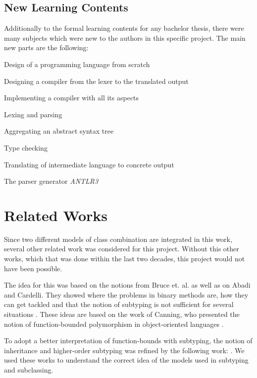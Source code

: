 \subsection{New Learning Contents}
Additionally to the formal learning contents for any bachelor thesis, there were many
subjects which were new to the authors in this specific project. The main new parts are the following:

\squishlist
	\item Design of a programming language from scratch
	\item Designing a compiler from the lexer to the translated output
	\item Implementing a compiler with all its aspects
	\squishlist
		\item Lexing and parsing
		\item Aggregating an abstract syntax tree
		\item Type checking
		\item Translating of intermediate language to concrete output
	\squishend
	\item The parser generator \emph{ANTLR3}
\squishend

\section{Related Works}
Since two different models of class combination are integrated in this
work, several other related work was considered for this project.
Without this other works, which that was done within the last two decades, this project would not
have been possible.

The idea for this was based on the notions from Bruce et. al. as
well as on Abadi and Cardelli. They showed where the
problems in binary methods are, how they can get tackled
and that the notion of subtyping is not sufficient for several
situations \cite{bruce_binary_1995,abadi_subtyping_1996}. These ideas are
based on the work of Canning, who presented the notion of function-bounded
polymorphism in object-oriented languages \cite{canning_f-bounded_1989}.

To adopt a better interpretation of function-bounds
with subtyping, the notion of inheritance and
higher-order subtyping was refined by the following work:
\cite{steffen_higher-order_1994,cook_inheritance_1990,taivalsaari_notion_1996}.
We used these works to understand the correct idea of the models used
in subtyping and subclassing.

